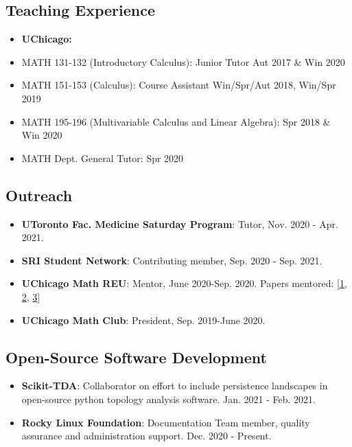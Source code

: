 \documentclass[12pt]{article}
\begin{document}
\subsection*{\sf Teaching Experience}
\begin{itemize}
\item[] \textbf{UChicago:}
\item[] MATH 131-132 (Introductory Calculus): Junior Tutor Aut 2017 \& Win 2020
\item[] MATH 151-153 (Calculus): Course Assistant Win/Spr/Aut 2018, Win/Spr 2019
\item[] MATH 195-196 (Multivariable Calculus and Linear Algebra): Spr 2018 \& Win 2020
\item[] MATH Dept. General Tutor: Spr 2020

\end{itemize}

\subsection*{\sf Outreach}
\begin{itemize}
  \item[] {\bf UToronto Fac. Medicine Saturday Program}: Tutor, Nov. 2020 - Apr. 2021.
\item[] {\bf SRI Student Network}: Contributing member, Sep. 2020 - Sep. 2021.
\item[] {\bf UChicago Math REU}: Mentor, June 2020-Sep. 2020. Papers mentored: [\href{https://math.uchicago.edu/~may/REU2020/REUPapers/Chen,Andrew.pdf}{1}, \href{https://math.uchicago.edu/~may/REU2020/REUPapers/Ghorbani.pdf}{2}, \href{https://math.uchicago.edu/~may/REU2020/REUPapers/Zhuang,Yuerong.pdf}{3}]
\item[] {\bf UChicago Math Club}: President, Sep. 2019-June 2020.\\
\end{itemize}

 \subsection*{\sf Open-Source Software Development}

\begin{itemize}

        \item[] {\bf Scikit-TDA}: Collaborator on effort to include persistence landscapes in open-source python topology analysis software. Jan. 2021 - Feb. 2021.

  \item[] {\bf Rocky Linux Foundation}: Documentation Team member, quality assurance and administration support. Dec. 2020 - Present.

\end{itemize}
\end{document}
